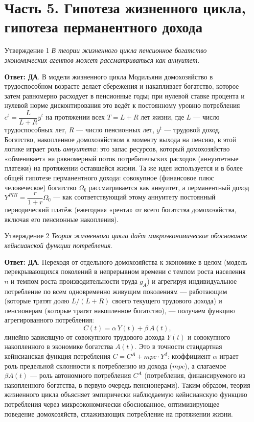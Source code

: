 \documentclass[10pt,a4paper]{article}
\newcommand{\qda}{\textbf{\color{yesgreen}Ответ: ДА}}
\newenvironment{answer}[2]{%
  \begin{qbox}{Утверждение #1}
  \textit{#2}\par\smallskip
}{%
  \end{qbox}\vspace{2pt}
}
\begin{document}
\newpage
\section{Часть 5. Гипотеза жизненного цикла, гипотеза перманентного дохода}
 
\begin{answer}{1}{В теории жизненного цикла пенсионное богатство экономических агентов может рассматриваться как аннуитет.}
\qda. В модели жизненного цикла Модильяни домохозяйство в трудоспособном возрасте делает сбережения и накапливает богатство, которое затем равномерно расходует в пенсионные годы; при нулевой ставке процента и нулевой норме дисконтирования это ведёт к постоянному уровню потребления $c^t=\dfrac{L}{L+R}y^t$ на протяжении всех $T=L+R$ лет жизни, где $L$ — число трудоспособных лет, $R$ — число пенсионных лет, $y^t$ — трудовой доход. Богатство, накопленное домохозяйством к моменту выхода на пенсию, в этой логике играет роль \emph{аннуитета}: это запас ресурсов, который домохозяйство «обменивает» на равномерный поток потребительских расходов (аннуитетные платежи) на протяжении оставшейся жизни. Та же идея используется и в более общей гипотезе перманентного дохода: совокупное (финансовое плюс человеческое) богатство $\Omega_0$ рассматривается как аннуитет, а перманентный доход $Y^{PIH}=\dfrac{r}{1+r}\Omega_0$ — как соответствующий этому аннуитету постоянный периодический платёж (ежегодная «рента» от всего богатства домохозяйства, включая его пенсионные накопления).
\end{answer}
 
\begin{answer}{2}{Теория жизненного цикла даёт микроэкономическое обоснование кейнсианской функции потребления.}
\qda. Переходя от отдельного домохозяйства к экономике в целом (модель перекрывающихся поколений в непрерывном времени с темпом роста населения $n$ и темпом роста производительности труда $g_A$) и агрегируя индивидуальное потребление по всем одновременно живущим поколениям — работающим (которые тратят долю $L/(L+R)$ своего текущего трудового дохода) и пенсионерам (которые тратят накопленное богатство), — получаем функцию агрегированного потребления:
\[
C(t) = \alpha\,Y(t) + \beta\,A(t),
\]
линейно зависящую от совокупного трудового дохода $Y(t)$ и совокупного накопленного в экономике богатства $A(t)$. Это в точности стандартная кейнсианская функция потребления $C=C^A+mpc\cdot Y^d$: коэффициент $\alpha$ играет роль предельной склонности к потреблению из дохода ($mpc$), а слагаемое $\beta A(t)$ — роль автономного потребления $C^A$ (потребления, финансируемого из накопленного богатства, в первую очередь пенсионерами). Таким образом, теория жизненного цикла объясняет эмпирически наблюдаемую кейнсианскую функцию потребления через микроэкономически обоснованное, оптимизирующее поведение домохозяйств, сглаживающих потребление на протяжении жизни.
\end{answer}
 
\end{document}
